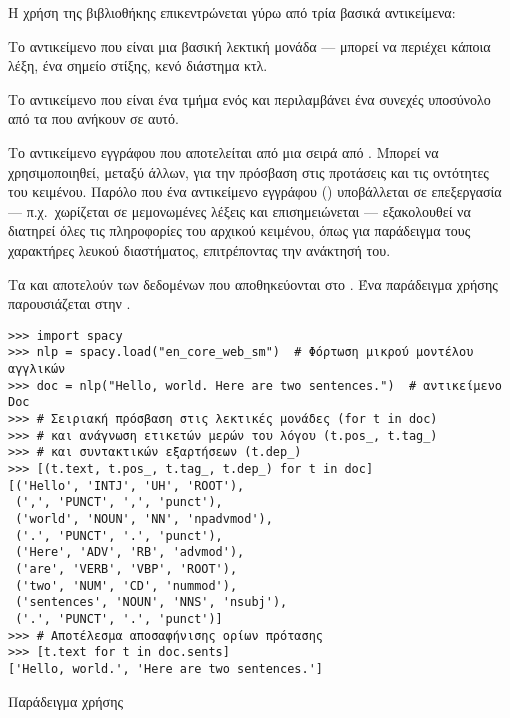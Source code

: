 Η χρήση της βιβλιοθήκης επικεντρώνεται γύρω από τρία βασικά αντικείμενα:
\begin{compactenum}
    \item Το αντικείμενο  που είναι μια βασική λεκτική μονάδα --- μπορεί να περιέχει κάποια λέξη, ένα σημείο στίξης, κενό διάστημα κτλ.
    \item Το αντικείμενο  που είναι ένα τμήμα ενός  και περιλαμβάνει ένα συνεχές υποσύνολο από τα  που ανήκουν σε αυτό.
    \item Το αντικείμενο εγγράφου  που αποτελείται από μια σειρά από .
          Μπορεί να χρησιμοποιηθεί, μεταξύ άλλων, για την πρόσβαση στις προτάσεις και τις οντότητες του κειμένου.
          Παρόλο που ένα αντικείμενο εγγράφου () υποβάλλεται σε επεξεργασία ---
          π.χ.\ χωρίζεται σε μεμονωμένες λέξεις και επισημειώνεται ---
          εξακολουθεί να διατηρεί όλες τις πληροφορίες του αρχικού κειμένου,
          όπως για παράδειγμα τους χαρακτήρες λευκού διαστήματος, επιτρέποντας την ανάκτησή του.
\end{compactenum}
Τα  και  αποτελούν  των δεδομένων που αποθηκεύονται στο .
Ένα παράδειγμα χρήσης παρουσιάζεται στην .

\begin{listing}
    \begin{verbatim}
>>> import spacy
>>> nlp = spacy.load("en_core_web_sm")  # Φόρτωση μικρού μοντέλου αγγλικών
>>> doc = nlp("Hello, world. Here are two sentences.")  # αντικείμενο Doc
>>> # Σειριακή πρόσβαση στις λεκτικές μονάδες (for t in doc)
>>> # και ανάγνωση ετικετών μερών του λόγου (t.pos_, t.tag_)
>>> # και συντακτικών εξαρτήσεων (t.dep_)
>>> [(t.text, t.pos_, t.tag_, t.dep_) for t in doc]
[('Hello', 'INTJ', 'UH', 'ROOT'),
 (',', 'PUNCT', ',', 'punct'),
 ('world', 'NOUN', 'NN', 'npadvmod'),
 ('.', 'PUNCT', '.', 'punct'),
 ('Here', 'ADV', 'RB', 'advmod'),
 ('are', 'VERB', 'VBP', 'ROOT'),
 ('two', 'NUM', 'CD', 'nummod'),
 ('sentences', 'NOUN', 'NNS', 'nsubj'),
 ('.', 'PUNCT', '.', 'punct')]
>>> # Αποτέλεσμα αποσαφήνισης ορίων πρότασης
>>> [t.text for t in doc.sents]
['Hello, world.', 'Here are two sentences.']
\end{verbatim}
    \caption{Παράδειγμα χρήσης }\label{lst:spacy}
\end{listing}

